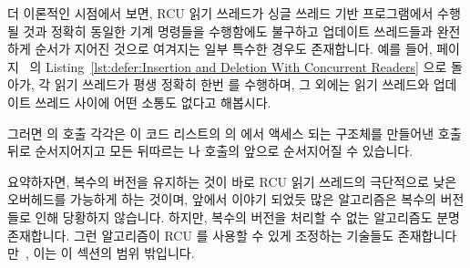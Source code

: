 \fi

더 이론적인 시점에서 보면, RCU 읽기 쓰레드가 싱글 쓰레드 기반 프로그램에서
수행될 것과 정확히 동일한 기계 명령들을 수행함에도 불구하고 업데이트 쓰레드들과
완전하게 순서가 지어진 것으로 여겨지는 일부 특수한 경우도 존재합니다.
예를 들어,
페이지~\pageref{lst:defer:Insertion and Deletion With Concurrent Readers} 의
Listing~\ref{lst:defer:Insertion and Deletion With Concurrent Readers} 으로
돌아가, 각 읽기 쓰레드가 평생 정확히 한번  를 수행하며, 그
외에는 읽기 쓰레드와 업데이트 쓰레드 사이에 어떤 소통도 없다고 해봅시다.
\begin{fcvref}
그러면  의 호출 각각은 이 코드 리스트의 
의  에서 액세스 되는  구조체를 만들어낸
 호출 뒤로 순서지어지고 모든 뒤따르는  나
 호출의 앞으로 순서지어질 수 있습니다.
\end{fcvref}

요약하자면, 복수의 버전을 유지하는 것이 바로 RCU 읽기 쓰레드의 극단적으로 낮은
오버헤드를 가능하게 하는 것이며, 앞에서 이야기 되었듯 많은 알고리즘은 복수의
버전들로 인해 당황하지 않습니다.
하지만, 복수의 버전을 처리할 수 없는 알고리즘도 분명 존재합니다.
그런 알고리즘이 RCU 를 사용할 수 있게 조정하는 기술들도
존재합니다만~\cite{PaulEdwardMcKenneyPhD}, 이는 이 섹션의 범위 밖입니다.

